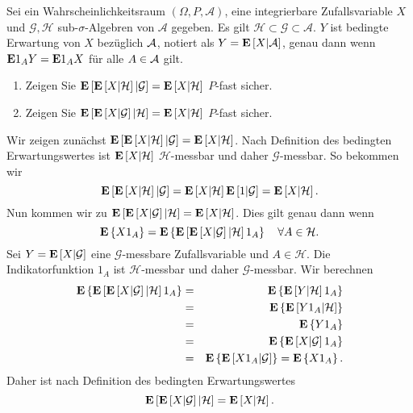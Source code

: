  Sei ein
Wahrscheinlichkeitsraum $\left( \Omega, P, \mathcal A \right)$, eine
integrierbare Zufallsvariable $X$ und $\mathcal G, \mathcal H$
sub-$\sigma$-Algebren von $\mathcal A$ gegeben. Es gilt $\mathcal H \subset
\mathcal G \subset \mathcal A$. $Y$ ist bedingte Erwartung von $X$ bezüglich $\mathcal A$, notiert
als $Y = \mathbf{E} \left[ X | \mathcal A \right]$, genau dann wenn $\mathbf{E} 1_A Y = \mathbf{E} 1_A X$ für alle $A\in\mathcal A$ gilt.
\begin{enumerate}
    \item Zeigen Sie $\mathbf{E} \left[  \mathbf{E} \left[ X | \mathcal H \right] | \mathcal G \right] = \mathbf{E} \left[ X | \mathcal H \right]$ $P$-fast sicher.
    \item Zeigen Sie $\mathbf{E} \left[  \mathbf{E} \left[ X | \mathcal G \right] | \mathcal H \right] = \mathbf{E} \left[ X | \mathcal H \right]$ $P$-fast sicher.
\end{enumerate}

\solution Wir zeigen zunächst 
$\mathbf{E}\left[ \mathbf{E}\left[ X | \mathcal H \right] | \mathcal G \right]=\mathbf{E} \left[ X | \mathcal H \right]$.
Nach Definition des bedingten Erwartungswertes ist $\mathbf{E}\left[ X| \mathcal H \right]$ 
$\mathcal H$-messbar und daher $\mathcal G$-messbar. So bekommen wir 
\begin{equation}
	\mathbf{E}\left[ \mathbf{E}\left[ X | \mathcal H \right] | \mathcal G \right] =
	\mathbf{E}\left[ X| \mathcal H \right] \mathbf{E}\left[ 1|\mathcal G \right] = 
	\mathbf{E} \left[ X | \mathcal H \right ].
\end{equation}
Nun kommen wir zu 
$\mathbf{E}\left[ \mathbf{E}\left[ X | \mathcal G \right] | \mathcal H \right]=\mathbf{E} \left[ X | \mathcal H \right]$.
Dies gilt genau dann wenn 
\begin{equation}
	\mathbf{E}\left\{ X 1_A \right\} 
	= \mathbf{E}\left\{ \mathbf{E}\left[ \mathbf{E}\left[ X|\mathcal G \right]|\mathcal H \right] 1_A \right\}  
	\quad \forall A\in\mathcal H.
\end{equation}
Sei $Y=\mathbf{E}\left[ X|\mathcal G \right]$ eine $\mathcal G$-messbare Zufallsvariable und
$A\in\mathcal H$. Die Indikatorfunktion $1_A$ ist $\mathcal H$-messbar und daher
$\mathcal G$-messbar. Wir berechnen
\begin{eqnarray}
	\mathbf{E}\left\{ \mathbf{E}\left[ \mathbf{E}\left[ X|\mathcal G \right]|\mathcal H \right] 1_A \right\} &=& 
	\mathbf{E}\left\{ \mathbf{E}\left[ Y|\mathcal H \right] 1_A \right\} \\
	&=& \mathbf{E}\left\{ \mathbf{E}\left[ Y 1_A| \mathcal H \right] \right\} \\
	&=& \mathbf{E}\left\{ Y 1_A \right\} \\
	&=& \mathbf{E}\left\{ \mathbf{E}\left[ X|\mathcal G \right] 1_A \right\} \\
	&=& \mathbf{E}\left\{ \mathbf{E}\left[ X 1_A| \mathcal G \right] \right\} = \mathbf{E}\left\{ X 1_A \right\}. 
\end{eqnarray}
Daher ist nach Definition des bedingten Erwartungswertes
\begin{equation}
	\mathbf{E}\left[ \mathbf{E}\left[ X | \mathcal G \right] | \mathcal H \right]=\mathbf{E} \left[ X | \mathcal H \right].
\end{equation}



